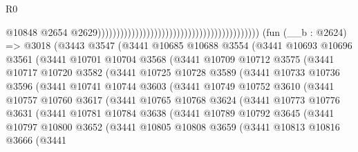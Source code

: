 \begin{lexlean}{R0}
\begin{coremodule}
                                                                                          @10848
                                                                                          @2654
                                                                                          @2629)))))))))))))))))))))))))))))))))))))))))))
    (fun (__b : @2624) =>
    @3018
      (@3443
        @3547
        (@3441
          @10685
          @10688
          @3554
          (@3441
            @10693
            @10696
            @3561
            (@3441
              @10701
              @10704
              @3568
              (@3441
                @10709
                @10712
                @3575
                (@3441
                  @10717
                  @10720
                  @3582
                  (@3441
                    @10725
                    @10728
                    @3589
                    (@3441
                      @10733
                      @10736
                      @3596
                      (@3441
                        @10741
                        @10744
                        @3603
                        (@3441
                          @10749
                          @10752
                          @3610
                          (@3441
                            @10757
                            @10760
                            @3617
                            (@3441
                              @10765
                              @10768
                              @3624
                              (@3441
                                @10773
                                @10776
                                @3631
                                (@3441
                                  @10781
                                  @10784
                                  @3638
                                  (@3441
                                    @10789
                                    @10792
                                    @3645
                                    (@3441
                                      @10797
                                      @10800
                                      @3652
                                      (@3441
                                        @10805
                                        @10808
                                        @3659
                                        (@3441
                                          @10813
                                          @10816
                                          @3666
                                          (@3441

\end{coremodule}
\end{lexlean}
